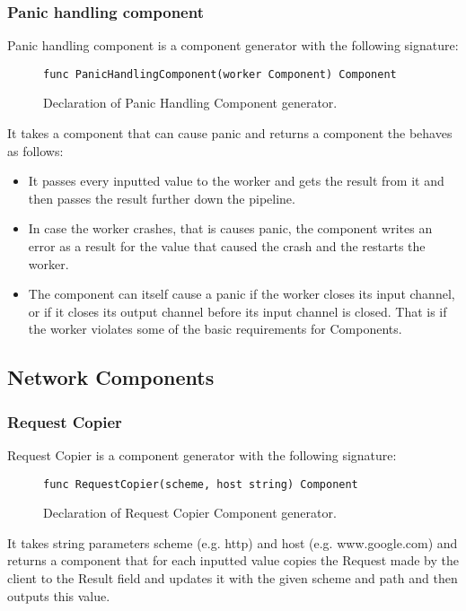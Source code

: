 \documentclass[12pt,a4paper]{article}
\begin{document}
\subsubsection{Panic handling component}
Panic handling component is a component generator with the following signature:

\begin{figure}[h]
\centering
\begin{lstlisting}
func PanicHandlingComponent(worker Component) Component
\end{lstlisting}
\caption[scale=1.0]{Declaration of Panic Handling Component generator.}
\label{fig:panicHandler}
\end{figure}

It takes a component that can cause panic and returns a component the behaves as follows:
\begin{itemize}
	\item It passes every inputted value to the worker and gets the result from it and then passes
				the result further down the pipeline.
	\item In case the worker crashes, that is causes panic, the component writes an error as a result 
				for the value that caused the crash and the restarts the worker.
	\item The component can itself cause a panic if the worker closes its input channel, or if 
				it closes its output channel before its input channel is closed. That is if the worker
				violates some of the basic requirements for Components.
\end{itemize}

\subsection{Network Components}
\subsubsection{Request Copier}
Request Copier is a component generator with the following signature:

\begin{figure}[h]
\centering
\begin{lstlisting}
func RequestCopier(scheme, host string) Component
\end{lstlisting}
\caption[scale=1.0]{Declaration of Request Copier Component generator.}
\label{fig:RequestCopier}
\end{figure}

It takes string parameters scheme (e.g. http) and host (e.g. www.google.com) 
and returns a component that for each inputted value copies the Request made 
by the client to the Result field and updates it with the given scheme and 
path and then outputs this value.
\end{document}
